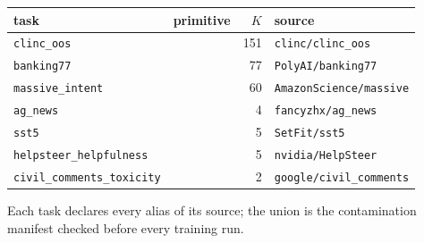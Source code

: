 \begin{center}
\small
\begin{tabular}{llrl}
\toprule
task & primitive & $K$ & source \\
\midrule
\texttt{clinc\_oos} & \choice{} & 151 & \texttt{clinc/clinc\_oos} \\
\texttt{banking77} & \choice{} & 77 & \texttt{PolyAI/banking77} \\
\texttt{massive\_intent} & \choice{} & 60 & \texttt{AmazonScience/massive} \\
\texttt{ag\_news} & \choice{} & 4 & \texttt{fancyzhx/ag\_news} \\
\texttt{sst5} & \score{} & 5 & \texttt{SetFit/sst5} \\
\texttt{helpsteer\_helpfulness} & \score{} & 5 & \texttt{nvidia/HelpSteer} \\
\texttt{civil\_comments\_toxicity} & \noul{} & 2 & \texttt{google/civil\_comments} \\
\bottomrule
\end{tabular}
\end{center}

Each task declares every alias of its source; the union is the
contamination manifest checked before every training run.
